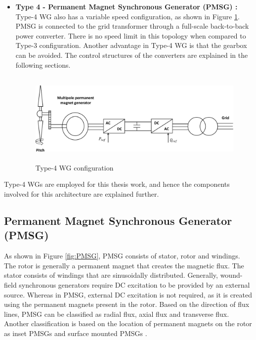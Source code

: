 \begin{itemize}
    \item \textbf{Type 4 - Permanent Magnet Synchronous Generator (PMSG) :} Type-4 \gls{WG} also has a variable speed configuration, as shown in Figure \ref{fig:Type4}. \gls{PMSG} is connected to the grid transformer through a full-scale back-to-back power converter. There is no speed limit in this topology when compared to Type-3 configuration. Another advantage in Type-4 \gls{WG} is that the gearbox can be avoided. The control structures of the converters are explained in the following sections.
    
\begin{figure}[H]
\centering
    \includegraphics[height = 4.5cm,width = 13.5cm]{Diagrams/Chapter_2/Type4WT_new.pdf}
    \caption{Type-4 WG configuration \cite{ali_wind_2012}}
    \label{fig:Type4}
\end{figure}
\end{itemize}

Type-4 \gls{WG}s are employed for this thesis work, and hence the components involved for this architecture are explained further.

\subsection{Permanent Magnet Synchronous Generator (PMSG)}\label{PMSG}
As shown in Figure \ref{fig:PMSG}, \gls{PMSG} consists of stator, rotor and windings. The rotor is generally a permanent magnet that creates the magnetic flux. The stator consists of windings that are sinusoidally distributed. Generally, wound-field synchronous generators require \gls{DC} excitation to be provided by an external source. Whereas in \gls{PMSG}, external \gls{DC} excitation is not required, as it is created using the permanent magnets present in the rotor. Based on the direction of flux lines, \gls{PMSG} can be classified as radial flux, axial flux and transverse flux. Another classification is based on the location of permanent magnets on the rotor as inset \gls{PMSG}s and surface mounted \gls{PMSG}s \cite{sebastian_transient_1989}.  

